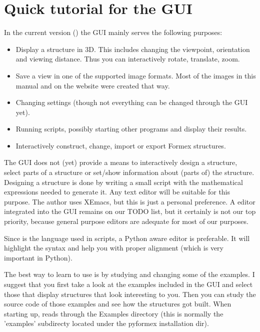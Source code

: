 \section{Quick tutorial for the \pyformex GUI}
\label{sec:gui-tutorial}
In the current version (\release) the GUI mainly serves the following purposes:
\begin{itemize}
\item Display a structure in 3D. This includes changing the viewpoint, orientation and viewing distance. Thus you can interactively rotate, translate, zoom.
\item Save a view in one of the supported image formats. Most of the images in this manual and on the \pyformex{} website were created that way. 
\item Changing \pyformex settings (though not everything can be changed through the GUI yet).
\item Running \pyformex scripts, possibly starting other programs and display their results.
\item Interactively construct, change, import or export Formex structures. 
\end{itemize}

The GUI does not (yet) provide a means to interactively design a structure, select parts of a structure or set/show information about (parts of) the structure. Designing a structure is done by writing a small script with the mathematical expressions needed to generate it. Any text editor will be suitable for this purpose. The author uses XEmacs, but this is just a personal preference. 
A \pyformex editor integrated into the GUI remains on our TODO list, but it certainly is not our top priority, because general purpose editors are adequate for most of our purposes. 

Since  is the language used in \pyformex scripts, a Python aware editor is preferable. It will highlight the syntax and help you with proper alignment (which is very important in Python). 
 

The best way to learn to use \pyformex is by studying and changing some of the examples. I suggest that you first take a look at the examples included in the \pyformex GUI and select those that display structures that look interesting to you. Then you can study the source code of those examples and see how the structures got built. 
When starting up, \pyformex reads through the Examples directory (this is normally the 'examples' subdirecty located under the pyformex installation dir).  


